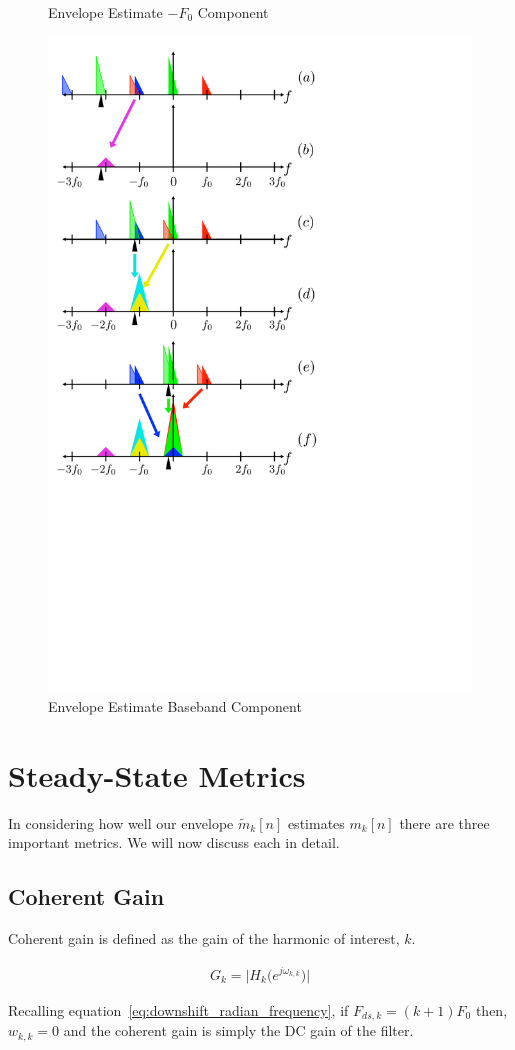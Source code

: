 \documentclass [11pt, proquest] {uwthesis}[2015/03/03]
\begin{document}
\begin{figure}[!ht]
    \caption{Envelope Estimate $-F_0$ Component}\label{fig:harmonic_envelope_F0}
    \includegraphics[width=.62\textwidth]{harmonic_envelope_0}
    \caption{Envelope Estimate Baseband Component}\label{fig:harmonic_envelope_0}
\end{figure}

\section{Steady-State Metrics}

In considering how well our envelope $\tilde{m}_k[n]$ estimates $m_k[n]$ there are three important metrics.  We will now discuss each in detail.

\subsection{Coherent Gain}

Coherent gain is defined as the gain of the harmonic of interest, $k$.

\begin{align}
G_k = \Big| H_k\big(e^{j\omega_{k,k}}\big) \Big|
\end{align}

Recalling equation~\ref{eq:downshift_radian_frequency}, if $F_{ds,k} = (k+1)F_0$ then, $w_{k,k} = 0$ and the coherent gain is simply the DC gain of the filter.
\end{document}

